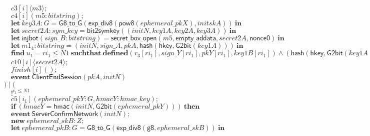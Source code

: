 \documentclass{article}
\newcommand{\cinput}[2]{{#1}({#2})}
\newcommand{\coutput}[2]{\overline{#1}\langle{#2}\rangle}
\newcommand{\kw}[1]{\mathbf{#1}}
\newcommand{\kwf}[1]{\mathsf{#1}}
\newcommand{\var}[1]{\mathit{#1}}
\newcommand{\kwt}[1]{\mathit{#1}}
\newcommand{\kwp}[1]{\mathit{#1}}
\newcommand{\kwc}[1]{\mathit{#1}}
\begin{document}
\begin{tabbing}
\>$\quad \coutput{\kwc{c3}[\var{i}]}{\var{m3}};$\\
\>$\quad \cinput{\kwc{c4}[\var{i}]}{\var{m5}: \kwt{bitstring}};$\\
\>$\quad \kw{let}\ \var{key3A}: \kwt{G} = \kwf{G8{\_}to{\_}G}(\kwf{exp{\_}div8}(\kwf{pow8}(\var{ephemeral{\_}pkX}), \var{initskA}))\ \kw{in}$\\
\>$\quad \kw{let}\ \var{secret2A}: \kwt{sym{\_}key} = \kwf{bit2symkey}(\kwf{}(\var{initN}, \var{key1A}, \var{key2A}, \var{key3A}))\ \kw{in}$\\
\>$\quad \kw{let}\ \kwf{injbot}(\var{sign{\_}B}: \kwt{bitstring}) = \kwf{secret{\_}box{\_}open}(\var{m5}, \kwf{empty{\_}addata}, \var{secret2A}, \kwf{nonce0})\ \kw{in}$\\
\>$\quad \kw{let}\ \var{m1}_{4}: \kwt{bitstring} = \kwf{}(\var{initN}, \var{sign{\_}A}, \var{pkA}, \kwf{hash}(\kwf{hkey}, \kwf{G2bit}(\var{key1A})))\ \kw{in}$\\
\>$\quad \kw{find}\ \var{u}_{1} = \var{ri}_{1} \leq \kwp{N1}\ \kw{suchthat}\ \kw{defined}(\var{r}_{3}[\var{ri}_{1}], \var{sign{\_}Y}[\var{ri}_{1}], \var{pkY}[\var{ri}_{1}], \var{key1B}[\var{ri}_{1}])\wedge (\kwf{hash}(\kwf{hkey}, \kwf{G2bit}(\var{key1A}))  =  \kwf{hash}(\kwf{hkey}, \kwf{G2bit}(\var{key1B}[\var{ri}_{1}]))) \wedge  (\var{pkA}  =  \var{pkY}[\var{ri}_{1}]) \wedge  (\var{sign{\_}A}  =  \var{sign{\_}Y}[\var{ri}_{1}]) \wedge  \kwf{check2}(\var{m1}_{4}, \kwf{pkgen2}(\var{initsignB}), \var{sign{\_}B})\ \kw{then}$\\
\>$\quad \coutput{\kwc{c10}[\var{i}]}{\var{secret2A}};$\\
\>$\quad \cinput{\kwc{finish}[\var{i}]}{};$\\
\>$\quad \kw{event}\ \kwf{ClientEndSession}(\var{pkA}, \var{initN})$\\
\>$) \mid ($\\
\>$\quad !^{\var{i}_{1} \leq \kwp{N1}}$\\
\>$\quad \cinput{\kwc{c5}[\var{i}_{1}]}{\var{ephemeral{\_}pkY}: \kwt{G}, \var{hmacY}: \kwt{hmac{\_}key}};$\\
\>$\quad \kw{if}\ (\var{hmacY}  =  \kwf{hmac}(\var{initN}, \kwf{G2bit}(\var{ephemeral{\_}pkY})))\ \kw{then}$\\
\>$\quad \kw{event}\ \kwf{ServerConfirmNetwork}(\var{initN});$\\
\>$\quad \kw{new}\ \var{ephemeral{\_}skB}: \kwt{Z};$\\
\>$\quad \kw{let}\ \var{ephemeral{\_}pkB}: \kwt{G} = \kwf{G8{\_}to{\_}G}(\kwf{exp{\_}div8}(\kwf{g8}, \var{ephemeral{\_}skB}))\ \kw{in}$\\

\end{tabbing}
\end{document}
